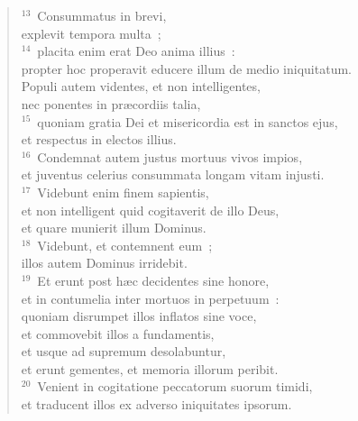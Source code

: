 \begin{verse}
${}^{13}$~Consummatus in brevi,\\ explevit tempora multa~;\\
${}^{14}$~placita enim erat Deo anima illius~:\\ propter hoc properavit educere illum de medio iniquitatum.\\ Populi autem videntes, et non intelligentes,\\ nec ponentes in pr\ae cordiis talia,\\
${}^{15}$~quoniam gratia Dei et misericordia est in sanctos ejus,\\ et respectus in electos illius.\\
${}^{16}$~Condemnat autem justus mortuus vivos impios,\\ et juventus celerius consummata longam vitam injusti.\\
${}^{17}$~Videbunt enim finem sapientis,\\ et non intelligent quid cogitaverit de illo Deus,\\ et quare munierit illum Dominus.\\
${}^{18}$~Videbunt, et contemnent eum~;\\ illos autem Dominus irridebit.\\
${}^{19}$~Et erunt post h\ae c decidentes sine honore,\\ et in contumelia inter mortuos in perpetuum~:\\ quoniam disrumpet illos inflatos sine voce,\\ et commovebit illos a fundamentis,\\ et usque ad supremum desolabuntur,\\ et erunt gementes, et memoria illorum peribit.\\
${}^{20}$~Venient in cogitatione peccatorum suorum timidi,\\ et traducent illos ex adverso iniquitates ipsorum.\end{verse}


